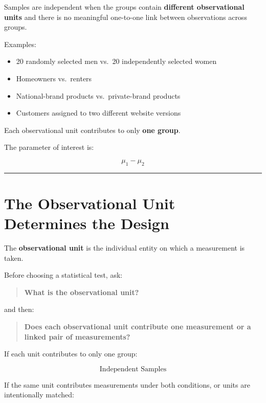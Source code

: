 \documentclass[
  letterpaper,
  DIV=11,
  numbers=noendperiod]{scrreprt}
\providecommand{\tightlist}{%
  \setlength{\itemsep}{0pt}\setlength{\parskip}{0pt}}
\begin{document}
Samples are independent when the groups contain \textbf{different
observational units} and there is no meaningful one-to-one link between
observations across groups.

Examples:

\begin{itemize}
\tightlist
\item
  20 randomly selected men vs.~20 independently selected women
\item
  Homeowners vs.~renters
\item
  National-brand products vs.~private-brand products
\item
  Customers assigned to two different website versions
\end{itemize}

Each observational unit contributes to only \textbf{one group}.

The parameter of interest is:

\[
\boxed{\mu_1-\mu_2}
\]

\begin{center}\rule{0.5\linewidth}{0.5pt}\end{center}


\chapter{The Observational Unit Determines the
Design}\label{the-observational-unit-determines-the-design}

The \textbf{observational unit} is the individual entity on which a
measurement is taken.

Before choosing a statistical test, ask:

\begin{quote}
\textbf{What is the observational unit?}
\end{quote}

and then:

\begin{quote}
\textbf{Does each observational unit contribute one measurement or a
linked pair of measurements?}
\end{quote}

If each unit contributes to only one group:

\[
\boxed{\text{Independent Samples}}
\]

If the same unit contributes measurements under both conditions, or
units are intentionally matched:
\end{document}
